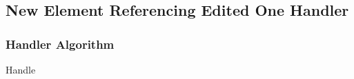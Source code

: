 \documentclass[../../Algorithms.tex]{subfiles}
\begin{document}
    \subsection{New Element Referencing Edited One Handler}

    \subsubsection{Handler Algorithm}

    \begin{algorithm}[H]
        \caption{Handle}

    \end{algorithm}
\end{document}
